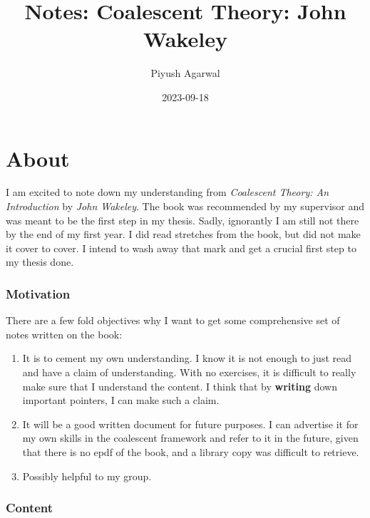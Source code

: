 \documentclass[
]{book}
\title{Notes: Coalescent Theory: John Wakeley}
\author{Piyush Agarwal}
\date{2023-09-18}
\theoremstyle{definition}
\theoremstyle{definition}
\theoremstyle{definition}
\theoremstyle{definition}
\theoremstyle{remark}
\begin{document}
\maketitle

{
\setcounter{tocdepth}{1}
\tableofcontents
}
\hypertarget{about}{%
\chapter{About}\label{about}}

I am excited to note down my understanding from \emph{Coalescent Theory: An Introduction} by \emph{John Wakeley}. The book was recommended by my supervisor and was meant to be the first step in my thesis. Sadly, ignorantly I am still not there by the end of my first year. I did read stretches from the book, but did not make it cover to cover. I intend to wash away that mark and get a crucial first step to my thesis done.

\hypertarget{motivation}{%
\subsection*{Motivation}\label{motivation}}

There are a few fold objectives why I want to get some comprehensive set of notes written on the book:

\begin{enumerate}
\def\labelenumi{\arabic{enumi}.}
\item
  It is to cement my own understanding. I know it is not enough to just read and have a claim of understanding. With no exercises, it is difficult to really make sure that I understand the content. I think that by \textbf{writing} down important pointers, I can make such a claim.
\item
  It will be a good written document for future purposes. I can advertise it for my own skills in the coalescent framework and refer to it in the future, given that there is no epdf of the book, and a library copy was difficult to retrieve.
\item
  Possibly helpful to my group.
\end{enumerate}

\hypertarget{content}{%
\subsection*{Content}\label{content}}
\end{document}
